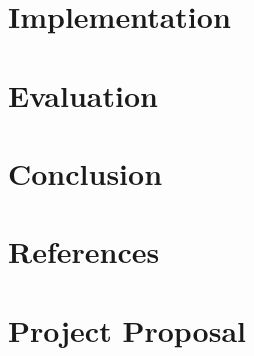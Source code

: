 \documentclass[12pt,twoside,notitlepage]{report}
\begin{document}

\cleardoublepage

\chapter{Implementation}


\cleardoublepage

\chapter{Evaluation}


\cleardoublepage
\chapter{Conclusion}


\cleardoublepage



\cleardoublepage

\appendix

\chapter{References}

\chapter{Project Proposal}
\parindent 0pt
\parskip 6pt

\end{document}
